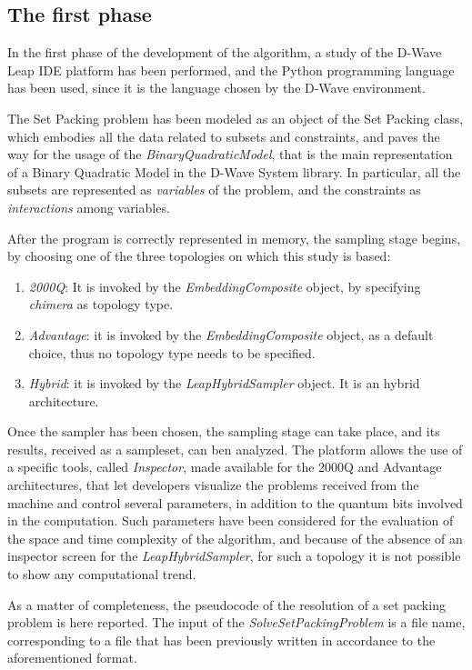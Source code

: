 \documentclass[oneside,a4paper]{article}
\begin{document}
\subsection{The first phase}
In the first phase of the development of the algorithm, a study of the D-Wave Leap IDE platform has been performed, and the Python programming language has been used, since it is the language chosen by the D-Wave environment. 

The Set Packing problem has been modeled as an object of the Set Packing class, which embodies all the data related to subsets and constraints, and paves the way for the usage of the \textit{BinaryQuadraticModel}, that is the main representation of a Binary Quadratic Model in the D-Wave System library. In particular, all the subsets are represented as \textit{variables} of the problem, and the constraints as \textit{interactions} among variables.

After the program is correctly represented in memory, the sampling stage begins, by choosing one of the three topologies on which this study is based:
\begin{enumerate}
    \item \textit{2000Q}: It is invoked by the \textit{EmbeddingComposite} object, by specifying \textit{chimera} as topology type.
    \item \textit{Advantage}: it is invoked by the \textit{EmbeddingComposite} object, as a default choice, thus no topology type needs to be specified.
    \item \textit{Hybrid}: it is invoked by the \textit{LeapHybridSampler} object. It is an hybrid architecture.
\end{enumerate}

Once the sampler has been chosen, the sampling stage can take place, and its results, received as a sampleset, can ben analyzed. The platform allows the use of a specific tools, called \textit{Inspector}, made available for the 2000Q and Advantage architectures, that let developers visualize the problems received from the machine and control several parameters, in addition to the quantum bits involved in the computation. Such parameters have been considered for the evaluation of the space and time complexity of the algorithm, and because of the absence of an inspector screen for the \textit{LeapHybridSampler}, for such a topology it is not possible to show any computational trend.

As a matter of completeness, the pseudocode of the resolution of a set packing problem is here reported. The input of the \textit{SolveSetPackingProblem} is a file name, corresponding to a file that has been previously written in accordance to the aforementioned format.
\end{document}
